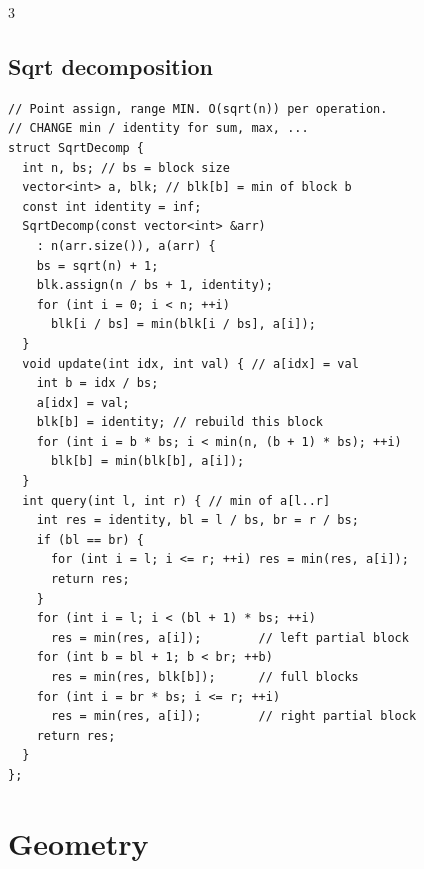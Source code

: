 \documentclass[8pt, a4paper]{article}
\begin{document}
\begin{multicols*}{3}
\subsection{Sqrt decomposition}
\begin{lstlisting}
// Point assign, range MIN. O(sqrt(n)) per operation.
// CHANGE min / identity for sum, max, ...
struct SqrtDecomp {
  int n, bs; // bs = block size
  vector<int> a, blk; // blk[b] = min of block b
  const int identity = inf;
  SqrtDecomp(const vector<int> &arr)
    : n(arr.size()), a(arr) {
    bs = sqrt(n) + 1;
    blk.assign(n / bs + 1, identity);
    for (int i = 0; i < n; ++i)
      blk[i / bs] = min(blk[i / bs], a[i]);
  }
  void update(int idx, int val) { // a[idx] = val
    int b = idx / bs;
    a[idx] = val;
    blk[b] = identity; // rebuild this block
    for (int i = b * bs; i < min(n, (b + 1) * bs); ++i)
      blk[b] = min(blk[b], a[i]);
  }
  int query(int l, int r) { // min of a[l..r]
    int res = identity, bl = l / bs, br = r / bs;
    if (bl == br) {
      for (int i = l; i <= r; ++i) res = min(res, a[i]);
      return res;
    }
    for (int i = l; i < (bl + 1) * bs; ++i)
      res = min(res, a[i]);        // left partial block
    for (int b = bl + 1; b < br; ++b)
      res = min(res, blk[b]);      // full blocks
    for (int i = br * bs; i <= r; ++i)
      res = min(res, a[i]);        // right partial block
    return res;
  }
};
\end{lstlisting}
\section{Geometry}

\end{multicols*}
\end{document}

